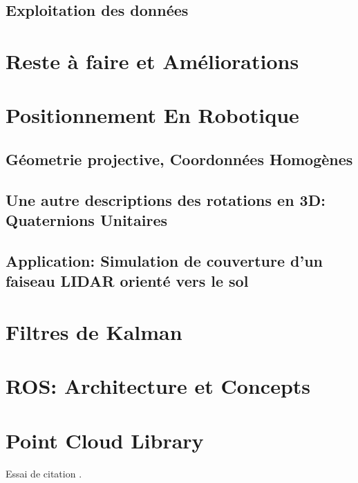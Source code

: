 \documentclass[12pt,a4paper]{report}
\begin{document}
	\section{Exploitation des données}

\chapter{Reste à faire et Améliorations}


\begin{appendix}
	\chapter{Positionnement En Robotique}
		\section{Géometrie projective, Coordonnées Homogènes}
		\section{Une autre descriptions des rotations en 3D: Quaternions Unitaires}
		\section{Application: Simulation de couverture d'un faiseau LIDAR orienté vers le sol}
	
	\chapter{Filtres de Kalman}
	
	\chapter{ROS: Architecture et Concepts}
	
	\chapter{Point Cloud Library}
	Essai de citation \cite{kaplan_understanding_2006}.

\end{appendix}

\nocite{*}


\end{document}
